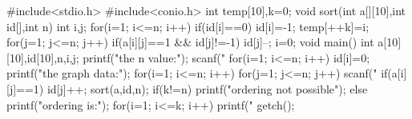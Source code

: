 #include<stdio.h> 
#include<conio.h> 
int temp[10],k=0; 
void sort(int a[][10],int id[],int n) 
{  
    int i,j; 
    for(i=1; i<=n; i++) 
    { 
        if(id[i]==0) 
        { 
            id[i]=-1; 
            temp[++k]=i; 
            for(j=1; j<=n; j++) 
            { 
                if(a[i][j]==1 && id[j]!=-1) 
                    id[j]--; 
            } 
            i=0; 
        } 
    } 
} 
void main() 
{ 
    int a[10][10],id[10],n,i,j; 
    printf("\nEnter the n value:"); 
    scanf("%
    for(i=1; i<=n; i++) 
        id[i]=0; 
    printf("\nEnter the graph data:\n"); 
    for(i=1; i<=n; i++) 
        for(j=1; j<=n; j++) 
        { 
            scanf("%
            if(a[i][j]==1) 
                id[j]++; 
        } 
    sort(a,id,n); 
    if(k!=n) 
        printf("\nTopological ordering not possible"); 
    else 
    { 
        printf("\nTopological ordering is:"); 
        for(i=1; i<=k; i++) 
            printf("%
    } 
    getch(); 
}
